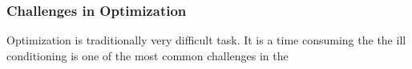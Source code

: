 \subsubsection{Challenges in Optimization}

Optimization is traditionally very difficult task. It is a time consuming the
the ill conditioning is one of the most common challenges in the 